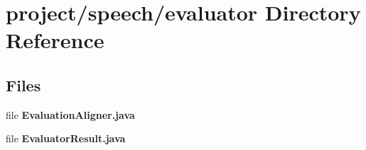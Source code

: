 \section{project/speech/evaluator Directory Reference}
\label{dir_d68846990b0b7aad0734fea5e49af333}
\subsection*{Files}
\begin{DoxyCompactItemize}
\item 
file {\bf Evaluation\+Aligner.\+java}
\item 
file {\bf Evaluator\+Result.\+java}
\end{DoxyCompactItemize}
